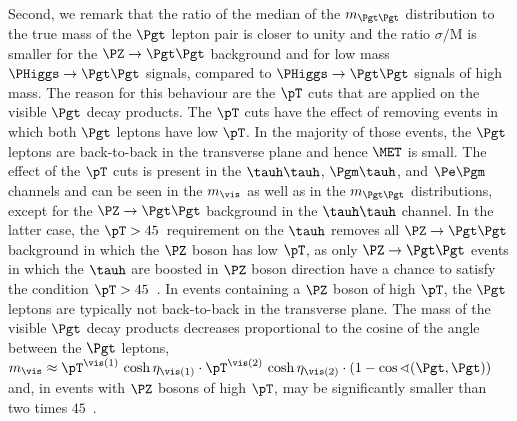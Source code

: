 Second, we remark that the ratio of the median of the $m_{\Pgt\Pgt}$ distribution to the true mass of the $\Pgt$ lepton pair 
is closer to unity and the ratio $\sigma/\textrm{M}$ is smaller
for the $\PZ \to \Pgt\Pgt$ background and for low mass $\PHiggs \to \Pgt\Pgt$ signals, compared to $\PHiggs \to \Pgt\Pgt$ signals of high mass.
The reason for this behaviour are the $\pT$ cuts that are applied on the visible $\Pgt$ decay products.
The $\pT$ cuts have the effect of removing events in which both $\Pgt$ leptons have low $\pT$.
In the majority of those events,
the $\Pgt$ leptons are back-to-back in the transverse plane and hence $\MET$ is small.
The effect of the $\pT$ cuts is present in the $\tauh\tauh$, $\Pgm\tauh$, and $\Pe\Pgm$ channels and can be seen in the $m_{\vis}$ as well as in the $m_{\Pgt\Pgt}$ distributions,
except for the $\PZ \to \Pgt\Pgt$ background in the $\tauh\tauh$ channel.
In the latter case,
the $\pT > 45$~\GeV requirement on the $\tauh$ removes all $\PZ \to \Pgt\Pgt$ background in which the $\PZ$ boson has low $\pT$,
as only $\PZ \to \Pgt\Pgt$ events in which the $\tauh$ are boosted in $\PZ$ boson direction have a chance to satisfy the condition $\pT > 45$~\GeV.
In events containing a $\PZ$ boson of high $\pT$,
the $\Pgt$ leptons are typically not back-to-back in the transverse plane.
The mass of the visible $\Pgt$ decay products decreases proportional to the cosine of the angle between the $\Pgt$ leptons,
$m_{\vis} \approx \pT^{\vis(1)} \, \cosh\eta_{\vis(1)} \cdot \pT^{\vis(2)} \, \cosh\eta_{\vis(2)} \cdot \left( 1 - \cos\sphericalangle(\Pgt,\Pgt) \right)$
and, in events with $\PZ$ bosons of high $\pT$, may be significantly smaller than two times $45$~\GeV.

